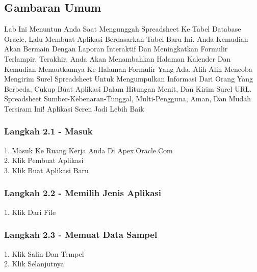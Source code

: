\documentclass{article}
\begin{document}
\subsection{Gambaran Umum }
Lab Ini Menuntun Anda Saat Mengunggah Spreadsheet Ke Tabel Database Oracle, Lalu Membuat Aplikasi Berdasarkan Tabel Baru Ini.  Anda Kemudian Akan Bermain Dengan Laporan Interaktif Dan Meningkatkan Formulir Terlampir.  Terakhir, Anda Akan Menambahkan Halaman Kalender Dan Kemudian Menautkannya Ke Halaman Formulir Yang Ada.  Alih-Alih Mencoba Mengirim Surel Spreadsheet Untuk Mengumpulkan Informasi Dari Orang Yang Berbeda, Cukup Buat Aplikasi Dalam Hitungan Menit, Dan Kirim Surel URL.  Spreadsheet Sumber-Kebenaran-Tunggal, Multi-Pengguna, Aman, Dan Mudah Tersiram Ini!  Aplikasi Scren Jadi Lebih Baik\\

\subsubsection{Langkah 2.1 - Masuk}
1.	Masuk Ke Ruang Kerja Anda Di Apex.Oracle.Com\\
2.	Klik Pembuat Aplikasi\\
3.	Klik Buat Aplikasi Baru\\
\subsubsection{Langkah 2.2 - Memilih Jenis Aplikasi}
1.	Klik Dari File\\
\subsubsection{Langkah 2.3 - Memuat Data Sampel}
1.	Klik Salin Dan Tempel\\
2.	Klik Selanjutnya\\
\end{document}
